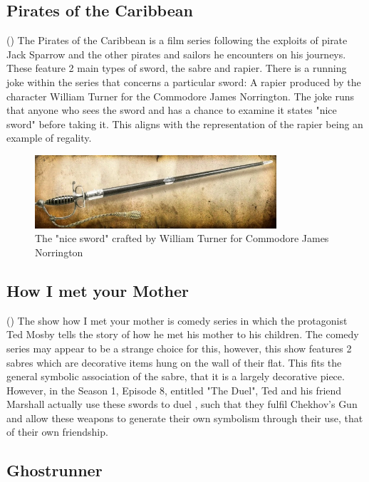 \documentclass{article}
\begin{document}
\subsection{Pirates of the Caribbean}

()
The Pirates of the Caribbean is a film series following the exploits of pirate Jack Sparrow and the other pirates and sailors he encounters on his journeys. These feature 2 main types of sword, the sabre and rapier. There is a running joke within the series that concerns a particular sword: A rapier produced by the character William Turner for the Commodore James Norrington. The joke runs that anyone who sees the sword and has a chance to examine it states "nice sword" before taking it. This aligns with the representation of the rapier being an example of regality.

\begin{figure}[h]
    \centering
    \includegraphics[width=0.8\textwidth]{Norringtonssword.png}
    \caption{\parencite{potcsword}The "nice sword" crafted by William Turner for Commodore James Norrington}
    \label{fig:potcSword}
\end{figure}

\subsection{How I met your Mother}

()
The show how I met your mother is comedy series in which the protagonist Ted Mosby tells the story of how he met his mother to his children. The comedy series may appear to be a strange choice for this, however, this show features 2 sabres which are decorative items hung on the wall of their flat. This fits the general symbolic association of the sabre, that it is a largely decorative piece. However, in the Season 1, Episode 8, entitled "The Duel", Ted and his friend Marshall actually use these swords to duel \parencite{theduel}, such that they fulfil Chekhov's Gun \parencite{delaney1990chekhov} and allow these weapons to generate their own symbolism through their use, that of their own friendship.

\subsection{Ghostrunner}
\end{document}
